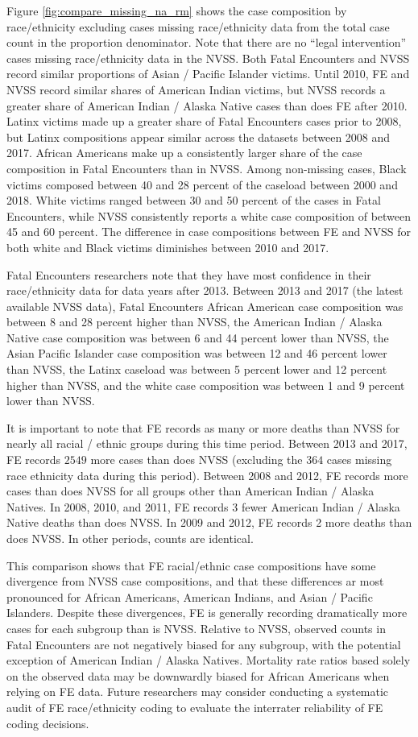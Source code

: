 \documentclass[9pt,twoside,lineno]{pnas-new}
\begin{document}
Figure \ref{fig:compare_missing_na_rm} shows the case composition by race/ethnicity excluding cases missing race/ethnicity data from the total case count in the proportion denominator. Note that there are no ``legal intervention'' cases missing race/ethnicity data in the NVSS. Both Fatal Encounters and NVSS record similar proportions of Asian / Pacific Islander victims. Until 2010, FE and NVSS record similar shares of American Indian victims, but NVSS records a greater share of American Indian / Alaska Native cases than does FE after 2010. Latinx victims made up a greater share of Fatal Encounters cases prior to 2008, but Latinx compositions appear similar across the datasets between 2008 and 2017. African Americans make up a consistently larger share of the case composition in Fatal Encounters than in NVSS. Among non-missing cases, Black victims composed between 40 and 28 percent of the caseload between 2000 and 2018. White victims ranged between 30 and 50 percent of the cases in Fatal Encounters, while NVSS consistently reports a white case composition of between 45 and 60 percent. The difference in case compositions between FE and NVSS for both white and Black victims diminishes between 2010 and 2017.

Fatal Encounters researchers note that they have most confidence in their race/ethnicity data for data years after 2013. Between 2013 and 2017 (the latest available NVSS data), Fatal Encounters African American case composition was between 8 and 28 percent higher than NVSS, the American Indian / Alaska Native case composition was between 6 and 44 percent lower than NVSS, the Asian Pacific Islander case composition was between 12 and 46 percent lower than NVSS, the Latinx caseload was between 5 percent lower and 12 percent higher than NVSS, and the white case composition was between 1 and 9 percent lower than NVSS. 

It is important to note that FE records as many or more deaths than NVSS for nearly all racial / ethnic groups during this time period. Between 2013 and 2017, FE records $2549$ more cases than does NVSS (excluding the $364$ cases missing race ethnicity data during this period). Between 2008 and 2012, FE records more cases than does NVSS for all groups other than American Indian / Alaska Natives. In 2008, 2010, and 2011, FE records 3 fewer American Indian / Alaska Native deaths than does NVSS. In 2009 and 2012, FE records 2 more deaths than does NVSS. In other periods, counts are identical.

This comparison shows that FE racial/ethnic case compositions have some divergence from NVSS case compositions, and that these differences ar most pronounced for African Americans, American Indians, and Asian / Pacific Islanders. Despite these divergences, FE is generally recording dramatically more cases for each subgroup than is NVSS. Relative to NVSS, observed counts in Fatal Encounters are not negatively biased for any subgroup, with the potential exception of American Indian / Alaska Natives. Mortality rate ratios based solely on the observed data may be downwardly biased for African Americans when relying on FE data. Future researchers may consider conducting a systematic audit of FE race/ethnicity coding to evaluate the interrater reliability of FE coding decisions. 
\end{document}
